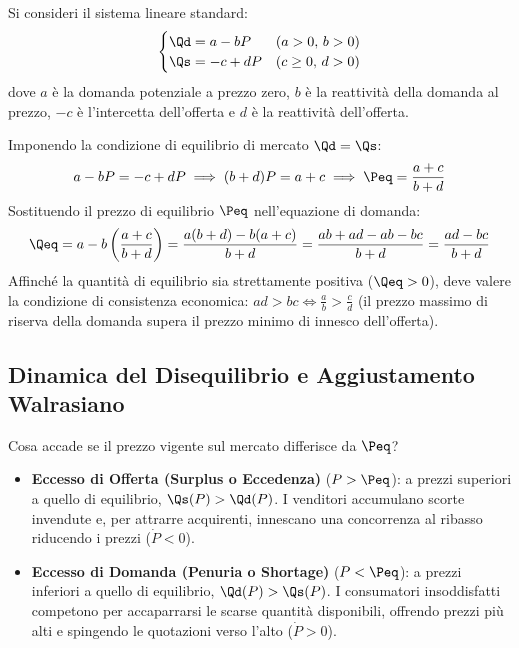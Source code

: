 \begin{dimostrazione}
Si consideri il sistema lineare standard:
\begin{equation}
    \begin{cases}
        \Qd = a - bP & (a > 0, \, b > 0) \\
        \Qs = -c + dP & (c \ge 0, \, d > 0)
    \end{cases}
\end{equation}
dove $a$ è la domanda potenziale a prezzo zero, $b$ è la reattività della domanda al prezzo, $-c$ è l'intercetta dell'offerta e $d$ è la reattività dell'offerta.

Imponendo la condizione di equilibrio di mercato $\Qd = \Qs$:
\begin{equation}
    a - bP = -c + dP \implies (b + d)P = a + c \implies \Peq = \frac{a + c}{b + d}
\end{equation}
Sostituendo il prezzo di equilibrio $\Peq$ nell'equazione di domanda:
\begin{equation}
    \Qeq = a - b \left( \frac{a + c}{b + d} \right) = \frac{a(b + d) - b(a + c)}{b + d} = \frac{ab + ad - ab - bc}{b + d} = \frac{ad - bc}{b + d}
\end{equation}
Affinché la quantità di equilibrio sia strettamente positiva ($\Qeq > 0$), deve valere la condizione di consistenza economica: $ad > bc \iff \frac{a}{b} > \frac{c}{d}$ (il prezzo massimo di riserva della domanda supera il prezzo minimo di innesco dell'offerta).
\end{dimostrazione}

\subsection{Dinamica del Disequilibrio e Aggiustamento Walrasiano}
Cosa accade se il prezzo vigente sul mercato differisce da $\Peq$?

\begin{itemize}
    \item \textbf{Eccesso di Offerta (Surplus o Eccedenza)} ($P > \Peq$): a prezzi superiori a quello di equilibrio, $\Qs(P) > \Qd(P)$. I venditori accumulano scorte invendute e, per attrarre acquirenti, innescano una concorrenza al ribasso riducendo i prezzi ($\dot{P} < 0$).
    \item \textbf{Eccesso di Domanda (Penuria o Shortage)} ($P < \Peq$): a prezzi inferiori a quello di equilibrio, $\Qd(P) > \Qs(P)$. I consumatori insoddisfatti competono per accaparrarsi le scarse quantità disponibili, offrendo prezzi più alti e spingendo le quotazioni verso l'alto ($\dot{P} > 0$).
\end{itemize}

